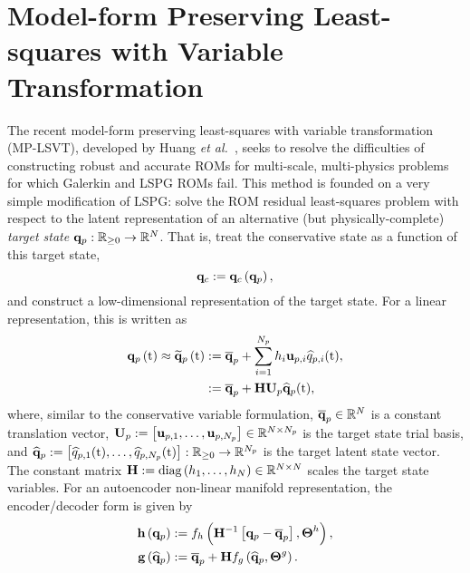 \section{Model-form Preserving Least-squares with Variable Transformation}\label{sec:mplsvt}

The recent model-form preserving least-squares with variable transformation (MP-LSVT), developed by Huang \textit{et al.}~\cite{Huang2022}, seeks to resolve the difficulties of constructing robust and accurate ROMs for multi-scale, multi-physics problems for which Galerkin and LSPG ROMs fail. This method is founded on a very simple modification of LSPG: solve the ROM residual least-squares problem with respect to the latent representation of an alternative (but physically-complete) \textit{target state} $\mathbf{q}_{p}: \mathbb{R}_{\ge 0} \rightarrow \mathbb{R}^{N}$. That is, treat the conservative state as a function of this target state,
%
\begin{equation}\label{eq:consFuncTarget}
    \mathbf{q}_{c} := \mathbf{q}_{c} \left(\mathbf{q}_{p}\right),
\end{equation}
%
and construct a low-dimensional representation of the target state. For a linear representation, this is written as
%
\begin{equation}\label{eq:primSolApprox}
    \begin{aligned}
        \primFunc{\timeVar} \approx \primFuncRom{\timeVar} &\defEq \primVecCent + \sum_{\dummyIdx=1}^{\numPrimModes} \primScaleVar_\dummyIdx \primTrialVecIdx \primVarCoefIdx (\timeVar), \\
        &\defEq \primAffineMap(\timeVar),
    \end{aligned}
\end{equation}
%
where, similar to the conservative variable formulation, $\mathbf{\overline{q}}_{p} \in \mathbb{R}^{N}$ is a constant translation vector, $\primTrial \defEq \left[\primTrialVec{1},\hdots,\primTrialVec{\numPrimModes}\right] \inRTwo{\numDOF}{\numPrimModes}$ is the target state trial basis, and $\mathbf{\widehat{q}}_{p} := \left[\widehat{q}_{p,1}(\text{t}),\hdots,\widehat{q}_{p,N_p}(\text{t})\right]: \mathbb{R}_{\ge 0} \rightarrow \mathbb{R}^{N_p}$ is the target latent state vector. The constant matrix $\primScale \defEq \text{diag}\left(\primScaleVar_1, \hdots , \primScaleVar_{\numDOF}\right) \inRTwo{\numDOF}{\numDOF}$ scales the target state variables. For an autoencoder non-linear manifold representation, the encoder/decoder form is given by
%
\begin{align}
    \encoderFunc{\primVec} &\defEq \nnLayer_{\encoderVar} \left(\primScaleInv\left[\primVec - \primVecCent\right], \nnParams^{\encoderVar}\right), \\
    \decoderFunc{\primVecCoef} &\defEq \primVecCent + \primScale \nnLayer_{\decoderVar} \left(\primVecCoef, \nnParams^{\decoderVar}\right). \label{eq:decoderFuncPrim}
\end{align}
